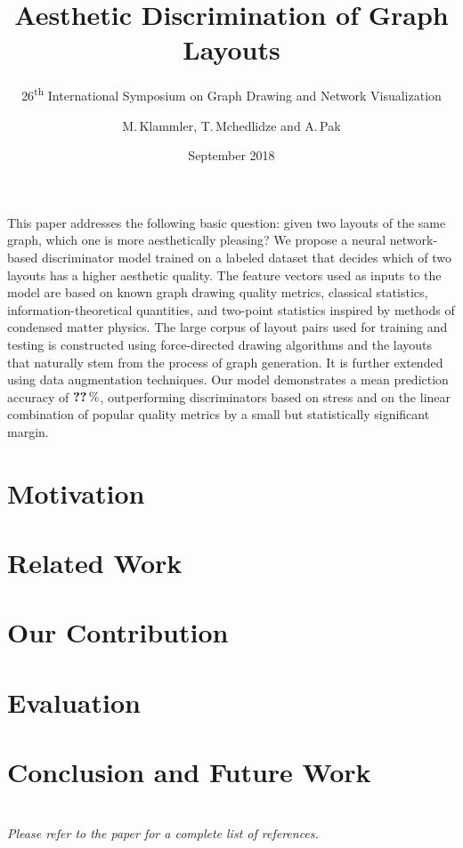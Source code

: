 \documentclass{beamer}
\title{Aesthetic Discrimination of Graph Layouts}
\subtitle{26\textsuperscript{th} International Symposium on Graph Drawing and Network Visualization}
\author{M.\,Klammler, T.\,Mchedlidze and A.\,Pak}
\institute[KIT {\textperiodcentered} Fraunhofer]{%
  Karlsruhe Institute of Technology in cooperation with
  Fraunhofer Institute of Optronics, System Technologies and Image Exploitation
}
\date{September 2018}
\providecommand*{\XValSuccessMean}{\mbox{\textbf{??}}}
\begin{document}
\begin{frame}
  \maketitle
\end{frame}

\begin{frame}
  \frametitle{\abstractname}
  \noindent\parbox{\textwidth}{%
    \footnotesize
    This paper addresses the following basic question: given two layouts of the same graph, which one is more
    aesthetically pleasing? We propose a neural network-based discriminator model trained on a labeled dataset that
    decides which of two layouts has a higher aesthetic quality. The feature vectors used as inputs to the model are
    based on known graph drawing quality metrics, classical statistics, information-theoretical quantities, and
    two-point statistics inspired by methods of condensed matter physics. The large corpus of layout pairs used for
    training and testing is constructed using force-directed drawing algorithms and the layouts that naturally stem from
    the process of graph generation. It is further extended using data augmentation techniques. Our model demonstrates a
    mean prediction accuracy of $\XValSuccessMean\percent$, outperforming discriminators based on stress and on the
    linear combination of popular quality metrics by a small but statistically significant margin.
  }
\end{frame}

\section{Motivation}
\section{Related Work}
\section{Our Contribution}
\section{Evaluation}
\section{Conclusion and Future Work}

\nocite{MScThesis}
\nocite{Arxiv}
\nocite{GitHubRepo}

\section{\bibname}
\begin{frame}[allowframebreaks]
  \frametitle{\bibname}
  \printbibliography
  \par\bigskip
  \emph{Please refer to the paper for a complete list of references.}
\end{frame}
\end{document}
